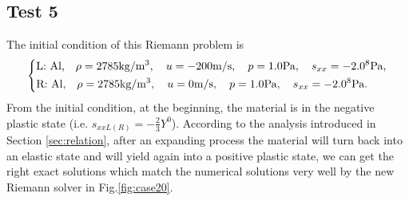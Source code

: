 \documentclass{article}
\numberwithin{equation}{section}
\numberwithin{table}{section}
\begin{document}
\subsection{Test 5}
The initial condition of this Riemann problem is
\begin{equation}
 \left\{ \begin{aligned}
	 &	 \text{L: Al,}\quad  \rho = 2785 \text{kg}/\text{m}^3, \quad  u = -200\text{m}/\text{s}, \quad  p = 1.0 \text{Pa}, \quad  s_{xx}=-2.0\time 10^8 \text{Pa},\\
	 &	 \text{R: Al,}\quad  \rho = 2785 \text{kg}/\text{m}^3, \quad  u = 0\text{m}/\text{s}, \quad  p = 1.0\text{Pa}, \quad  s_{xx}= -2.0 \time 10^8 \text{Pa}.\\
   \end{aligned}
 \right.
\end{equation}
From the initial condition, at the beginning, the material is in the negative plastic state (i.e. $s_{xxL(R)}=-\frac{2}{3}{Y}^{0}$). According to the analysis introduced in  Section \ref{sec:relation}, after an expanding process the material will turn back into an elastic state and will yield again into a positive plastic state, we can get the right exact solutions which match the numerical solutions very well by the new Riemann solver in Fig.\ref{fig:case20}.
\end{document}
